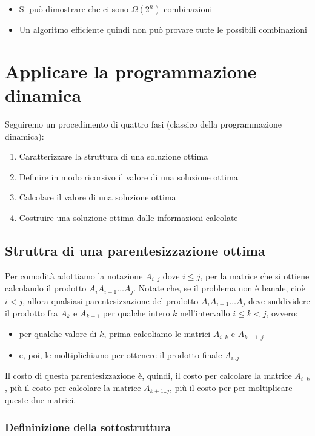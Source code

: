 \begin{itemize}
  \item
        Si può dimostrare che ci sono $\Omega(2^n)$ combinazioni
  \item
        Un algoritmo efficiente quindi non può provare tutte le possibili
        combinazioni
\end{itemize}


\section{Applicare la programmazione dinamica}

Seguiremo un procedimento di quattro fasi (classico della programmazione
dinamica):
\begin{enumerate}
  \item Caratterizzare la struttura di una soluzione ottima
  \item Definire in modo ricorsivo il valore di una soluzione ottima
  \item Calcolare il valore di una soluzione ottima
  \item Costruire una soluzione ottima dalle informazioni calcolate
\end{enumerate}

\subsection{Struttra di una parentesizzazione ottima}

Per comodità adottiamo la notazione $A_{i..j}$ dove $i \le j$, per
la matrice che si ottiene calcolando il prodotto
$A_i A_{i+1} \ldots A_j$. Notate che, se il problema non è banale, cioè
$i < j$, allora qualsiasi parentesizzazione del prodotto
$A_i A_{i+1} \ldots A_j$ deve suddividere il prodotto fra $A_k$ e
$A_{k+1}$ per qualche intero $k$ nell'intervallo $i \le k < j$,
ovvero:
\begin{itemize}
  \item per qualche valore di $k$, prima calcoliamo le matrici
        $A_{i..k}$ e $A_{k+1..j}$
  \item e, poi, le moltiplichiamo per ottenere
        il prodotto finale $A_{i..j}$
\end{itemize}

Il costo di questa parentesizzazione è, quindi, il costo per calcolare
la matrice $A_{i..k}$, più il costo per calcolare la matrice
$A_{k+1..j}$, più il costo per per moltiplicare queste due matrici.


\subsubsection{Defininizione della sottostruttura}

